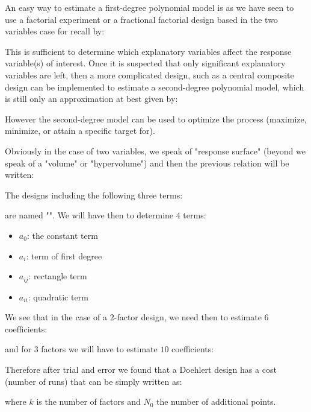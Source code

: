 	An easy way to estimate a first-degree polynomial model is as we have seen to use a factorial experiment or a fractional factorial design based in the two variables case for recall by:
	
	This is sufficient to determine which explanatory variables affect the response variable(s) of interest. Once it is suspected that only significant explanatory variables are left, then a more complicated design, such as a central composite design can be implemented to estimate a second-degree polynomial model, which is still only an approximation at best given by:
			
	However the second-degree model can be used to optimize the process (maximize, minimize, or attain a specific target for).
	
	Obviously in the case of two variables, we speak of "response surface" (beyond we speak of a "volume" or "hypervolume") and then the previous relation will be written:
	
	The designs including the following three terms:
	
	are named "". We will have then to determine $4$ terms:
	\begin{itemize}
		\item $a_0$: the constant term
		\item $a_i$: term of first degree
		\item $a_{ij}$: rectangle term
		\item $a_{ii}$: quadratic term
	\end{itemize}
	We see that in the case of a $2$-factor design, we need then to estimate $6$ coefficients:
	
 	and for $3$ factors we will have to estimate $10$ coefficients:
	
	Therefore after trial and error we found that a Doehlert design has a cost (number of runs) that can be simply written as:
	
	where $k$ is the number of factors and $N_0$ the number of additional points.
	
